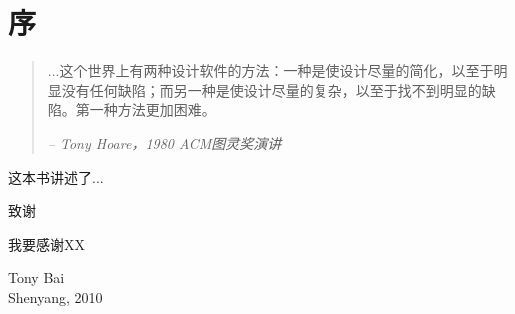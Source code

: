 
\chapter*{序}
\begin{quotation}
...这个世界上有两种设计软件的方法：一种是使设计尽量的简化，以至于明显没有任何缺陷；而另一种是使设计尽量的复杂，以至于找不到明显的缺陷。第一种方法更加困难。
\begin{flushright}
\textit{ -- Tony Hoare，1980 ACM图灵奖演讲}                 %
\end{flushright}
\end{quotation}
这本书讲述了...

\begin{flushleft}
致谢\\
\end{flushleft}

我要感谢XX

\begin{flushright}
Tony Bai\\
Shenyang, 2010
\end{flushright}
